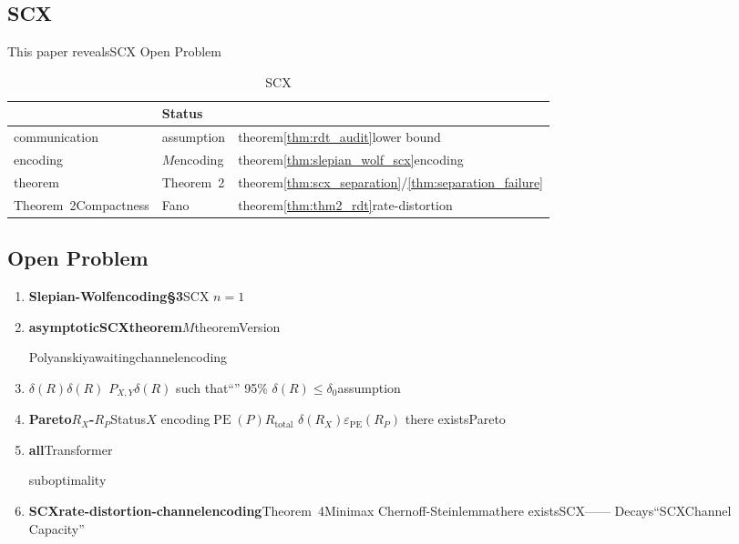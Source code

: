 \documentclass[11pt,a4paper]{article}
\theoremstyle{remark}
\DeclareMathOperator{\PE}{PE}
\begin{document}
\subsection{SCX}

This paper revealsSCX\cite{scx2026theorems,scx2026situs}\textbf{}
Open Problem

\begin{table}[htbp]
\centering
\caption{SCX}
\label{tab:gaps}
\begin{tabular}{@{}p{3cm}p{5cm}p{5cm}@{}}
\toprule
\textbf{} & \textbf{Status} & \textbf{} \\
\midrule
communication & assumption & theorem\ref{thm:rdt_audit}lower bound\\
encoding & $M$encoding & theorem\ref{thm:slepian_wolf_scx}encoding\\
theorem & Theorem~2 & theorem\ref{thm:scx_separation}/\ref{thm:separation_failure}\\
Theorem~2Compactness & Fano & theorem\ref{thm:thm2_rdt}rate-distortion\\
\bottomrule
\end{tabular}
\end{table}

\subsection{Open Problem}

\begin{enumerate}[label=(\arabic*), leftmargin=*]

    \item \textbf{Slepian-Wolfencoding\S3}SCX
          $n=1$

    \item \textbf{asymptoticSCXtheorem}$M$theoremVersion
          
          Polyanskiyawaiting\cite{polyanskiy2010}channelencoding

    \item \textbf{$\delta(R)$}$\delta(R)$
          $P_{X,Y}$$\delta(R)$
          such that``''\textbf{}
          \textbf{}95\%
          $\delta(R) \leq \delta_0$assumption

    \item \textbf{Pareto$R_X$-$R_P$}Status$X$
          encoding$\PE(P)$$R_{\text{total}}$
          $\delta(R_X)$$\varepsilon_{\PE}(R_P)$
          there existsPareto

    \item \textbf{}
          \textbf{all}Transformer
          
          suboptimality

    \item \textbf{SCXrate-distortion-channelencoding}Theorem~4Minimax
          Chernoff-Steinlemmathere existsSCX\textbf{}——
          Decays``SCXChannel Capacity''

\end{enumerate}
\end{document}
